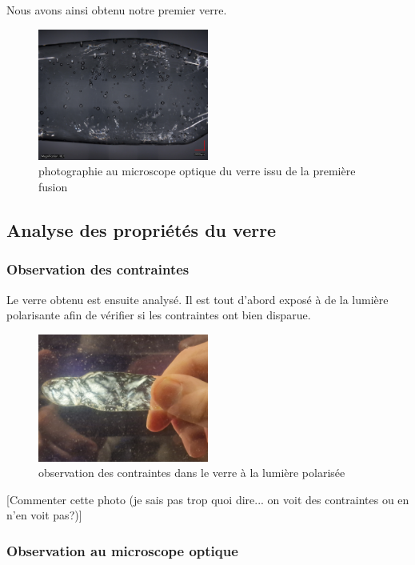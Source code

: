 \documentclass{article}
\begin{document}
Nous avons ainsi obtenu notre premier verre.

\begin{figure}[h]
    \centering
    \includegraphics[width=0.5\textwidth]{photos/mosaic.jpg}
    \caption{photographie au microscope optique du verre issu de la première fusion}
\end{figure}

\subsection{Analyse des propriétés du verre}

\subsubsection{Observation des contraintes}
Le verre obtenu est ensuite analysé. Il est tout d'abord exposé à de la lumière polarisante afin de vérifier si les contraintes ont bien disparue.

\begin{figure}[h]
    \centering
    \includegraphics[width=0.5\textwidth]{photos/contraintes.jpg}
    \caption{observation des contraintes dans le verre à la lumière polarisée}
\end{figure}


[Commenter cette photo (je sais pas trop quoi dire... on voit des contraintes ou en n'en voit pas?)]

\subsubsection{Observation au microscope optique}
\end{document}
